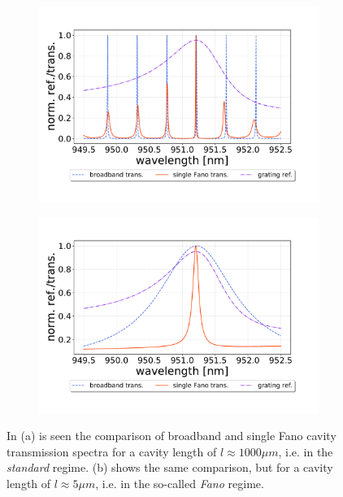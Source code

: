 \begin{figure}[h!]
    \centering
    \begin{subfigure}[b]{0.49\textwidth}
        \includegraphics[width=\textwidth]{figures/fano_and_broadband_cavity_1000um.pdf}
        \caption{}
        \label{fig:standard_regime_trans}
    \end{subfigure}
    \begin{subfigure}[b]{0.49\textwidth}
        \includegraphics[width=\textwidth]{figures/fano_and_broadband_cavity_5um.pdf}
        \caption{}
        \label{fig:fano_regime_trans}
    \end{subfigure}
    \caption{In (a) is seen the comparison of broadband and single Fano cavity transmission spectra for a cavity length of $l \approx 1000 \mu m$, i.e. in the \emph{standard} regime. (b) shows the same comparison, but for a cavity length of $l \approx 5 \mu m$, i.e. in the so-called \emph{Fano} regime.}
\end{figure}

